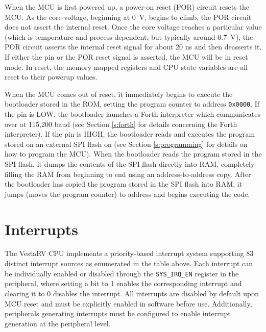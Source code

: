 \documentclass[11pt,pdftex,portrait,letterpaper]{article}
\begin{document}
When the MCU is first powered up, a power-on reset (POR) circuit resets the MCU. As the core voltage, beginning at 0~V, begins to climb, the POR circuit does not assert the internal reset. Once the core voltage reaches a particular value (which is temperature and process dependent, but typically around 0.7~V), the POR circuit asserts the internal reset signal for about 20 ns and then deasserts it. If either the  pin or the POR reset signal is asserted, the MCU will be in reset mode. In reset, the memory mapped registers and CPU state variables are all reset to their powerup values.

When the MCU comes out of reset, it immediately begins to execute the bootloader stored in the ROM, setting the program counter to address \texttt{0x0000}. If the  pin is LOW, the bootloader launches a Forth interpreter which communicates over  at 115,200 baud (see Section \ref{s:forth} for details concerning the Forth interpreter). If the  pin is HIGH, the bootloader reads and executes the program stored on an external SPI flash on  (see Section \ref{s:programming} for details on how to program the MCU). When the bootloader reads the program stored in the SPI flash, it dumps the contents of the SPI flash directly into RAM, completely filling the RAM from beginning to end using an address-to-address copy. After the bootloader has copied the program stored in the SPI flash into RAM, it jumps (moves the program counter) to address \texttt{\RamProgramStartAddress} and begins executing the code.

\newpage



\section{Interrupts} \label{s:interrupts}



The VestaRV CPU implements a priority-based interrupt system supporting 83 distinct interrupt sources as enumerated in the table above. Each interrupt can be individually enabled or disabled through the \texttt{SYS\_IRQ\_EN} register in the  peripheral, where setting a bit to 1 enables the corresponding interrupt and clearing it to 0 disables the interrupt. All interrupts are disabled by default upon MCU reset and must be explicitly enabled in software before use. Additionally, peripherals generating interrupts must be configured to enable interrupt generation at the peripheral level.
\end{document}
